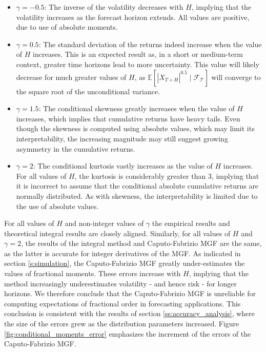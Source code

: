 \begin{itemize}
\item \(\gamma = -0.5\): The inverse of the volatility decreases with \(H\), implying that the volatility increases as the forecast horizon extends. All values are positive, due to use of absolute moments.
\item \(\gamma = 0.5\): The standard deviation of the returns indeed increase when the value of \(H\) increases. This is an expected result as, in a short or medium-term context, greater time horizons lead to more uncertainty. This value will likely decrease for much greater values of \(H\), as \(\mathbb{E}[|X_{T + H}|^{0.5} \mid \mathcal{F_T}]\) will converge to the square root of the unconditional variance.

\item  \(\gamma = 1.5\): The conditional skewness greatly increases when the value of \(H\) increases, which implies that cumulative returns have heavy tails. Even though the skewness is computed using absolute values, which may limit its interpretability, the increasing magnitude may still suggest growing asymmetry in the cumulative returns.

\item  \(\gamma = 2\): The conditional kurtosis vastly increases as the value of \(H\) increases. For all values of \(H\), the kurtosis is considerably greater than 3, implying that it is incorrect to assume that the conditional absolute cumulative returns are normally distributed. As with skewness, the interpretability is limited due to the use of absolute values.
\end{itemize}

For all values of \(H\) and non-integer values of \(\gamma\) the empirical results and  theoretical  integral results are closely aligned. Similarly, for all values of \(H\) and \(\gamma = 2\), the results of the integral method and Caputo-Fabrizio MGF are the same, as the latter is accurate for integer derivatives of the MGF. As indicated in section \ref{s:simulation}, the Caputo-Fabrizio MGF greatly under-estimates the values of fractional moments. These errors increase with \(H\), implying that the method increasingly underestimates volatility - and hence risk - for longer horizons. We therefore conclude that the Caputo-Fabrizio MGF is unreliable for computing expectations of fractional order in forecasting applications. This conclusion is consistent with the results of section \ref{ss:accuracy_analysis}, where the size of the errors grew as the distribution parameters increased. Figure \ref{fig:conditional_moments_error} emphasizes the increment of the errors of the Caputo-Fabrizio MGF.



